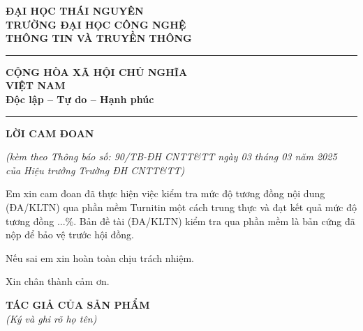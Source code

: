 \thispagestyle{plain}

\noindent
\begin{minipage}[t]{0.48\textwidth}
\centering\bfseries\fontsize{12pt}{14pt}\selectfont
ĐẠI HỌC THÁI NGUYÊN\\[0.16cm]
TRƯỜNG ĐẠI HỌC CÔNG NGHỆ\\
THÔNG TIN VÀ TRUYỀN THÔNG\\[-0.03cm]
\rule{5.9cm}{0.4pt}
\end{minipage}\hfill
\begin{minipage}[t]{0.48\textwidth}
\centering\bfseries\fontsize{12pt}{14pt}\selectfont
CỘNG HÒA XÃ HỘI CHỦ NGHĨA\\
VIỆT NAM\\[0.16cm]
Độc lập -- Tự do -- Hạnh phúc\\[-0.03cm]
\rule{5.2cm}{0.4pt}
\end{minipage}

\vspace{1.85cm}
\begin{center}
\textbf{\fontsize{16pt}{18pt}\selectfont LỜI CAM ĐOAN}
\end{center}

\vspace{0.25cm}
\begin{center}
\begin{minipage}{0.78\textwidth}
\centering\itshape
(kèm theo Thông báo số: 90/TB-ĐH CNTT\&TT ngày 03 tháng 03 năm 2025\\
của Hiệu trưởng Trường ĐH CNTT\&TT)
\end{minipage}
\end{center}

\vspace{0.45cm}
Em xin cam đoan đã thực hiện việc kiểm tra mức độ tương đồng nội dung (ĐA/KLTN) qua phần mềm Turnitin một cách trung thực và đạt kết quả mức độ tương đồng ...\%. Bản đề tài (ĐA/KLTN) kiểm tra qua phần mềm là bản cứng đã nộp để bảo vệ trước hội đồng.

Nếu sai em xin hoàn toàn chịu trách nhiệm.

Xin chân thành cảm ơn.

\vspace{1.05cm}
\begin{flushright}
\begin{minipage}{0.42\textwidth}
\centering
\textbf{TÁC GIẢ CỦA SẢN PHẨM}\\
\textit{(Ký và ghi rõ họ tên)}\\[1.05cm]
\end{minipage}
\end{flushright}
